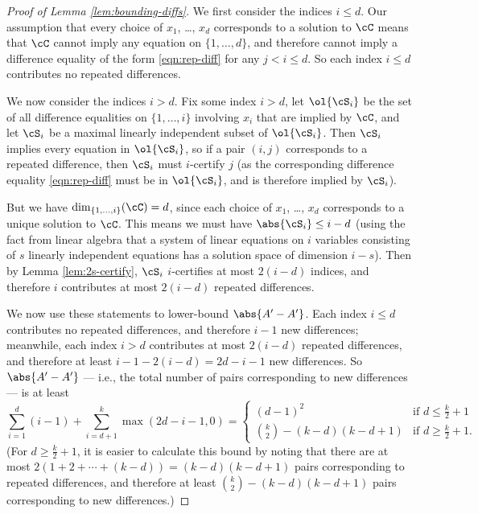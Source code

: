 \begin{proof}[Proof of Lemma \ref{lem:bounding-diffs}]
    We first consider the indices $i \leq d$. Our assumption that every choice of $x_1$, \ldots, $x_d$ corresponds to a solution to $\cC$ means that $\cC$ cannot imply any equation on $\{1, \ldots, d\}$, and therefore cannot imply a difference equality of the form \eqref{eqn:rep-diff} for any $j < i \leq d$. So each index $i \leq d$ contributes no repeated differences.

    We now consider the indices $i > d$. Fix some index $i > d$, let $\ol{\cS_i}$ be the set of all difference equalities on $\{1, \ldots, i\}$ involving $x_i$ that are implied by $\cC$, and let $\cS_i$ be a maximal linearly independent subset of $\ol{\cS_i}$. Then $\cS_i$ implies every equation in $\ol{\cS_i}$, so if a pair $(i, j)$ corresponds to a repeated difference, then $\cS_i$ must $i$-certify $j$ (as the corresponding difference equality \eqref{eqn:rep-diff} must be in $\ol{\cS_i}$, and is therefore implied by $\cS_i$). 

    But we have $\dim_{\{1, \ldots, i\}}(\cC) = d$, since each choice of $x_1$, \ldots, $x_d$ corresponds to a unique solution to $\cC$. This means we must have $\abs{\cS_i} \leq i - d$ (using the fact from linear algebra that a system of linear equations on $i$ variables consisting of $s$ linearly independent equations has a solution space of dimension $i - s$). Then by Lemma \ref{lem:2s-certify}, $\cS_i$ $i$-certifies at most $2(i - d)$ indices, and therefore $i$ contributes at most $2(i - d)$ repeated differences. 

    We now use these statements to lower-bound $\abs{A' - A'}$. Each index $i \leq d$ contributes no repeated differences, and therefore $i - 1$ new differences; meanwhile, each index $i > d$ contributes at most $2(i - d)$ repeated differences, and therefore at least $i - 1 - 2(i - d) = 2d - i - 1$ new differences. So $\abs{A' - A'}$ --- i.e., the total number of pairs corresponding to new differences --- is at least \[\sum_{i = 1}^d (i - 1) + \sum_{i = d + 1}^k \max(2d - i - 1, 0) = \begin{cases} (d - 1)^2 & \text{if $d \leq \frac{k}{2} + 1$} \\ \binom{k}{2} - (k - d)(k - d + 1) & \text{if $d \geq \frac{k}{2} + 1$}.\end{cases}\] (For $d \geq \frac{k}{2} + 1$, it is easier to calculate this bound by noting that there are at most $2(1 + 2 + \cdots + (k - d)) = (k - d)(k - d + 1)$ pairs corresponding to repeated differences, and therefore at least $\binom{k}{2} - (k - d)(k - d + 1)$ pairs corresponding to new differences.) 
\end{proof}

